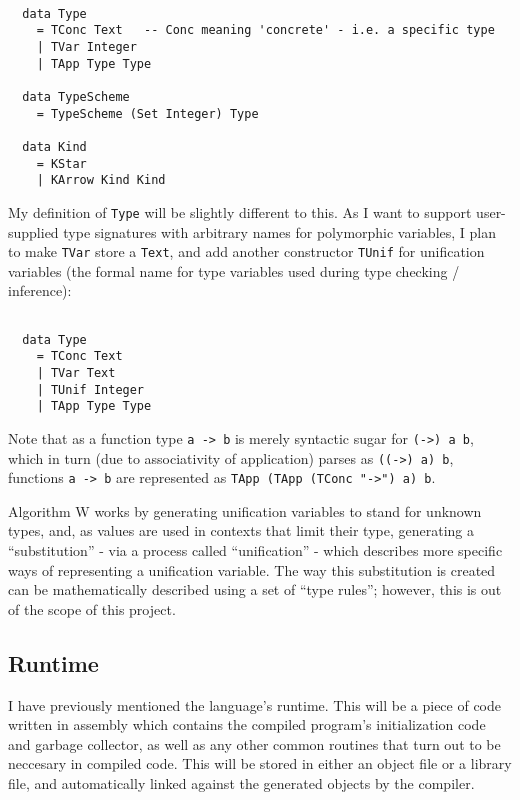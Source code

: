 \documentclass[9pt]{extarticle}
\begin{document}
\begin{verbatim}

  data Type
    = TConc Text   -- Conc meaning 'concrete' - i.e. a specific type
    | TVar Integer
    | TApp Type Type

  data TypeScheme
    = TypeScheme (Set Integer) Type

  data Kind
    = KStar
    | KArrow Kind Kind

\end{verbatim}

My definition of \verb'Type' will be slightly different to this. As I
want to support user-supplied type signatures with arbitrary names for
polymorphic variables, I plan to make \verb'TVar' store a \verb'Text',
and add another constructor \verb'TUnif' for unification variables (the
formal name for type variables used during type checking / inference):

\begin{verbatim}

  data Type
    = TConc Text
    | TVar Text
    | TUnif Integer
    | TApp Type Type

\end{verbatim}

Note that as a function type \verb'a -> b' is merely syntactic sugar for
\verb'(->) a b', which in turn (due to associativity of application)
parses as \verb'((->) a) b', functions \verb'a -> b' are represented as
\verb'TApp (TApp (TConc "->") a) b'.

Algorithm W works by generating unification variables to stand for
unknown types, and, as values are used in contexts that limit their
type, generating a ``substitution'' - via a process called
``unification'' - which describes more specific ways of representing a
unification variable. The way this substitution is created can be
mathematically described using a set of ``type rules''; however, this is
out of the scope of this project.

\subsection{Runtime}

I have previously mentioned the language's runtime. This will be a piece
of code written in assembly which contains the compiled program's
initialization code and garbage collector, as well as any other common
routines that turn out to be neccesary in compiled code. This will be
stored in either an object file or a library file, and automatically
linked against the generated objects by the compiler.
\end{document}
